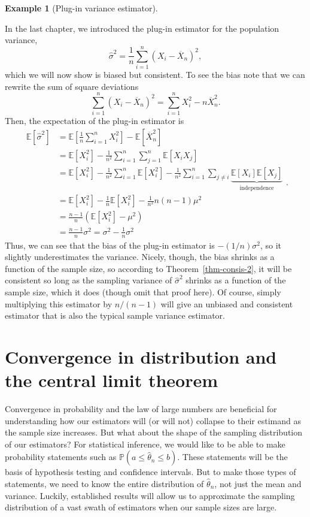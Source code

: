 \documentclass[
  13pt,
  letterpaper,
  DIV=11,
  numbers=noendperiod]{scrreprt}
\newcommand{\E}{\mathbb{E}}
\renewcommand{\P}{\mathbb{P}}
\newcommand{\Xbar}{\overline{X}}
\theoremstyle{plain}
\theoremstyle{definition}
\newtheorem{example}{Example}[chapter]
\theoremstyle{definition}
\theoremstyle{remark}
\begin{document}
\begin{example}[Plug-in variance
estimator]\protect\hypertarget{exm-plug-in-variance}{}\label{exm-plug-in-variance}

In the last chapter, we introduced the plug-in estimator for the
population variance, \[
\widehat{\sigma}^2 = \frac{1}{n} \sum_{i=1}^n (X_i - \Xbar_n)^2,
\] which we will now show is biased but consistent. To see the bias note
that we can rewrite the sum of square deviations
\[\sum_{i=1}^n (X_i - \Xbar_n)^2 = \sum_{i=1}^n X_i^2 - n\Xbar_n^2. \]
Then, the expectation of the plug-in estimator is \[
\begin{aligned}
\E[\widehat{\sigma}^2] & = \E\left[\frac{1}{n}\sum_{i=1}^n X_i^2\right] - \E[\Xbar_n^2] \\
&= \E[X_i^2] - \frac{1}{n^2}\sum_{i=1}^n \sum_{j=1}^n \E[X_iX_j] \\
&= \E[X_i^2] - \frac{1}{n^2}\sum_{i=1}^n \E[X_i^2] - \frac{1}{n^2}\sum_{i=1}^n \sum_{j\neq i} \underbrace{\E[X_i]\E[X_j]}_{\text{independence}} \\
&= \E[X_i^2] - \frac{1}{n}\E[X_i^2] - \frac{1}{n^2} n(n-1)\mu^2 \\
&= \frac{n-1}{n} \left(\E[X_i^2] - \mu^2\right) \\
&= \frac{n-1}{n} \sigma^2 = \sigma^2 - \frac{1}{n}\sigma^2
\end{aligned}. 
\] Thus, we can see that the bias of the plug-in estimator is
\(-(1/n)\sigma^2\), so it slightly underestimates the variance. Nicely,
though, the bias shrinks as a function of the sample size, so according
to Theorem~\ref{thm-consis-2}, it will be consistent so long as the
sampling variance of \(\widehat{\sigma}^2\) shrinks as a function of the
sample size, which it does (though omit that proof here). Of course,
simply multiplying this estimator by \(n/(n-1)\) will give an unbiased
and consistent estimator that is also the typical sample variance
estimator.

\end{example}

\section{Convergence in distribution and the central limit
theorem}\label{convergence-in-distribution-and-the-central-limit-theorem}

Convergence in probability and the law of large numbers are beneficial
for understanding how our estimators will (or will not) collapse to
their estimand as the sample size increases. But what about the shape of
the sampling distribution of our estimators? For statistical inference,
we would like to be able to make probability statements such as
\(\P(a \leq \widehat{\theta}_n \leq b)\). These statements will be the
basis of hypothesis testing and confidence intervals. But to make those
types of statements, we need to know the entire distribution of
\(\widehat{\theta}_n\), not just the mean and variance. Luckily,
established results will allow us to approximate the sampling
distribution of a vast swath of estimators when our sample sizes are
large.
\end{document}
